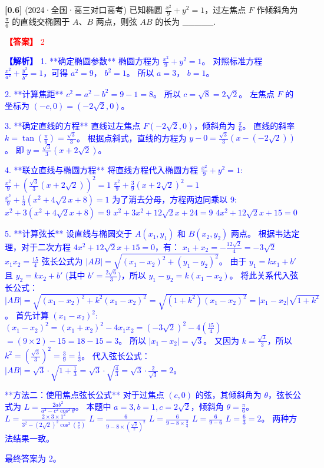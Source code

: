 \documentclass[varwidth=16cm, border=2mm]{standalone}
\begin{document}
\textbf{[0.6]} (2024·全国·高三对口高考) 已知椭圆 $\frac{x^2}{9} + y^2 = 1$，过左焦点 $F$ 作倾斜角为 $\frac{\pi}{6}$ 的直线交椭圆于 $A、B$ 两点，则弦 $AB$ 的长为 _____.

\vspace{0.2cm}\par\noindent\textcolor{red}{\textbf{【答案】} 2}
\par\noindent\textcolor{blue}{\textbf{【解析】} 1. **确定椭圆参数**
椭圆方程为 $\frac{x^2}{9} + y^2 = 1$。
对照标准方程 $\frac{x^2}{a^2} + \frac{y^2}{b^2} = 1$，可得 $a^2 = 9$， $b^2 = 1$。
所以 $a=3$， $b=1$。

2. **计算焦距**
$c^2 = a^2 - b^2 = 9 - 1 = 8$。
所以 $c = \sqrt{8} = 2\sqrt{2}$。
左焦点 $F$ 的坐标为 $(-c, 0) = (-2\sqrt{2}, 0)$。

3. **确定直线的方程**
直线过左焦点 $F(-2\sqrt{2}, 0)$，倾斜角为 $\frac{\pi}{6}$。
直线的斜率 $k = \tan(\frac{\pi}{6}) = \frac{\sqrt{3}}{3}$。
根据点斜式，直线的方程为 $y - 0 = \frac{\sqrt{3}}{3}(x - (-2\sqrt{2}))$。
即 $y = \frac{\sqrt{3}}{3}(x + 2\sqrt{2})$。

4. **联立直线与椭圆方程**
将直线方程代入椭圆方程 $\frac{x^2}{9} + y^2 = 1$:
$\frac{x^2}{9} + \left(\frac{\sqrt{3}}{3}(x + 2\sqrt{2})\right)^2 = 1$
$\frac{x^2}{9} + \frac{3}{9}(x + 2\sqrt{2})^2 = 1$
$\frac{x^2}{9} + \frac{1}{3}(x^2 + 4\sqrt{2}x + 8) = 1$
为了消去分母，方程两边同乘以 9:
$x^2 + 3(x^2 + 4\sqrt{2}x + 8) = 9$
$x^2 + 3x^2 + 12\sqrt{2}x + 24 = 9$
$4x^2 + 12\sqrt{2}x + 15 = 0$

5. **计算弦长**
设直线与椭圆交于 $A(x_1, y_1)$ 和 $B(x_2, y_2)$ 两点。
根据韦达定理，对于二次方程 $4x^2 + 12\sqrt{2}x + 15 = 0$，有：
$x_1 + x_2 = -\frac{12\sqrt{2}}{4} = -3\sqrt{2}$
$x_1 x_2 = \frac{15}{4}$
弦长公式为 $|AB| = \sqrt{(x_1 - x_2)^2 + (y_1 - y_2)^2}$。
由于 $y_1 = kx_1 + b'$ 且 $y_2 = kx_2 + b'$ (其中 $b' = \frac{2\sqrt{6}}{3}$)，所以 $y_1 - y_2 = k(x_1 - x_2)$。
将此关系代入弦长公式：
$|AB| = \sqrt{(x_1 - x_2)^2 + k^2(x_1 - x_2)^2} = \sqrt{(1+k^2)(x_1 - x_2)^2} = |x_1 - x_2|\sqrt{1+k^2}$。
首先计算 $(x_1 - x_2)^2$: 
$(x_1 - x_2)^2 = (x_1 + x_2)^2 - 4x_1 x_2 = (-3\sqrt{2})^2 - 4\left(\frac{15}{4}\right)$
$= (9 \times 2) - 15 = 18 - 15 = 3$。
所以 $|x_1 - x_2| = \sqrt{3}$。
又因为 $k = \frac{\sqrt{3}}{3}$，所以 $k^2 = \left(\frac{\sqrt{3}}{3}\right)^2 = \frac{3}{9} = \frac{1}{3}$。
代入弦长公式：
$|AB| = \sqrt{3} \cdot \sqrt{1 + \frac{1}{3}} = \sqrt{3} \cdot \sqrt{\frac{4}{3}} = \sqrt{3} \cdot \frac{2}{\sqrt{3}} = 2$。

**方法二：使用焦点弦长公式**
对于过焦点 $(c,0)$ 的弦，其倾斜角为 $\theta$，弦长公式为 $L = \frac{2ab^2}{a^2 - c^2 \cos^2\theta}$。
本题中 $a=3, b=1, c=2\sqrt{2}$，倾斜角 $\theta = \frac{\pi}{6}$。
$L = \frac{2 \times 3 \times 1^2}{3^2 - (2\sqrt{2})^2 \cos^2(\frac{\pi}{6})}$
$L = \frac{6}{9 - 8 \times \left(\frac{\sqrt{3}}{2}\right)^2}$
$L = \frac{6}{9 - 8 \times \frac{3}{4}}$
$L = \frac{6}{9 - 6}$
$L = \frac{6}{3} = 2$。
两种方法结果一致。

最终答案为 $2$。}
\end{document}
